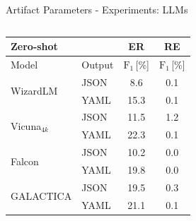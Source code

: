 \documentclass[en,16:9,smallfoot]{sdqbeamer}
\begin{document}
\begin{frame}{Artifact Parameters - Experiments: LLMs}
\begin{columns}
\begin{overlayarea}{\textwidth}{7cm}
{    \begin{table}
     \begin{small}
      \centering
      \begin{tabular}{ll|cc}
        \hline
        \multicolumn{2}{l|}{\textbf{Zero-shot}} &
        ER &
        RE \\
        \hline
        Model & Output & $\text{F}_1$\,[\%] &
                         $\text{F}_1$\,[\%] \\
        \hline

        \multirow{2}{*}{WizardLM} &
        JSON & 8.6
             &  0.1 \\
        \ & YAML &
        \hphantom{${}_{\Delta\text{+6.7}}$}
        15.3{\color{parametergreen}{${}_{\Delta\text{+6.7}}$}}
                  &
        \hphantom{${}_{\Delta\text{+0.0}}$}
        0.1{\color{contextgrey}{${}_{\Delta\text{+0.0}}$}}  \\
        \cline{1-2}

        \multirow{2}{*}{Vicuna${}_{4k}$} &
        JSON & 11.5
             & 1.2 \\
        \ & YAML &
        \hphantom{${}_{\Delta\text{+10.8}}$}
        22.3{\color{parametergreen}{${}_{\Delta\text{+10.8}}$}}
                  &
        \hphantom{${}_{\Delta\text{-1.1}}$}
        0.1{\color{valuered}{${}_{\Delta\text{-1.1}}$}}  \\
        \cline{1-2}

        \multirow{2}{*}{Falcon} &
        JSON & 10.2
             & 0.0 \\
        \ & YAML &
        \hphantom{${}_{\Delta\text{+9.6}}$}
        19.8{\color{parametergreen}{${}_{\Delta\text{+9.6}}$}}
                  &
        \hphantom{${}_{\Delta\text{+0.0}}$}
        0.0{\color{contextgrey}{${}_{\Delta\text{+0.0}}$}}  \\
        \cline{1-2}

        \multirow{2}{*}{GALACTICA} &
        JSON & 19.5
             & 0.3 \\
        \ & YAML &
        \hphantom{${}_{\Delta\text{+1.6}}$}
        21.1{\color{parametergreen}{${}_{\Delta\text{+1.6}}$}}
                  &
        \hphantom{${}_{\Delta\text{-0.2}}$}
        0.1{\color{valuered}{${}_{\Delta\text{-0.2}}$}}  \\
        \cline{1-2}


\end{tabular}
\end{small}
\end{table}}
\end{overlayarea}
\end{columns}
\end{frame}
\end{document}
